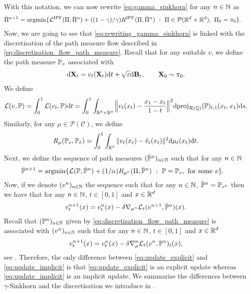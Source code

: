 \documentclass{article}
\begin{document}
 With this notation, we can now rewrite \eqref{eq:gamma_sinkhorn} for any $n \in \mathbb{N}$ as 
 \begin{align}
 \label{eq:rewriting_gamma_sinkhorn_2}
     &\bar{\Pi}^{n+1} = \argmin \ensembleLigne{\Lnonparam^{\mathrm{IPF}}(\Pi, \bar{\Pi}^n) + ((1-\gamma)/\gamma) R^{\mathrm{IPF}}(\Pi, \bar{\Pi}^n)}{\Pi \in \mathcal{P}(\rset^d \times \rset^d), \ \Pi_0 = \pi_0} . 
 \end{align}
  Now, we are going to see that \eqref{eq:rewriting_gamma_sinkhorn} is linked with the discretisation of the path measure flow described in \eqref{eq:discretisation_flow_path_measure}. Recall that for any suitable $v$, we define the path measure $\mathbb{P}_v$ associated with  
\begin{equation}
    \mathrm{d} \mathbf{X}_t = v_t(\mathbf{X}_t) \mathrm{d} t + \sqrt{\varepsilon} \mathrm{d} \mathbf{B}_t , \qquad \mathbf{X}_0 \sim \pi_0 . 
\end{equation}
 We define 
 \begin{equation}
\label{eq:loss_function_appendix}
    \Lnonparam(v, \Pbb) =\int_0^1  \Lnonparam(v_t, \Pbb)\rmd t= \int_0^1 \int_{\rset^d \times \rset^d} \Big\| v_t(x_t) - \frac{x_1 - x_t}{1-t}\Big\|^2 \rmd \projR{\Qbb}(\Pbb)_{t,1}(x_t, x_1) \rmd s . 
\end{equation}
Similarly, for any $\mu \in \mathcal{P}(\mathcal{C})$, we define 
\begin{equation}
    R_\mu(\mathbb{P}_v, \mathbb{P}_{\tilde{v}}) = \int_0^1 \int_{\mathbb{R}^d} \| v_t(x_t) - \tilde{v}_t(x_t)\|^2 \mathrm{d} \mu_t(x_t) \mathrm{d} t .  
\end{equation}
 Next, we define the sequence of path measures $(\bar{\mathbb{P}}^n)_{n \in \mathbb{N}}$ such that for any $n \in \mathbb{N}$
 \begin{align}
 \label{eq:rewriting_gamma_sinkhorn}
     &\bar{\Pbb}^{n+1} = \argmin \ensembleLigne{\Lnonparam(\Pbb, \bar{\Pbb}^n) + (1/\alpha) R_{\mu^n}(\Pi, \bar{\Pbb}^n)}{\Pbb = \Pbb_v, \ \text{for some $v$}} .
 \end{align}
 Now, if we denote $(v^n)_{n \in \mathbb{N}}$ the sequence such that for any $n \in \mathbb{N}$, $\bar{\mathbb{P}}^n = \mathbb{P}_{v^n}$ then we have that for any $n \in \mathbb{N}$, $t \in [0,1]$ and $x \in \mathbb{R}^d$
 \begin{equation}
 \label{eq:update_implicit}
     v^{n+1}_t(x) = v^n_t(x) - \delta \nabla_{\mu^n} \Lnonparam_t(v^{n+1}, \bar{\Pbb}^n)(x) .
 \end{equation}
 Recall that $(\mathbb{P}^n)_{n \in \mathbb{N}}$ given by \eqref{eq:discretisation_flow_path_measure} is associated with $(v^n)_{n \in \mathbb{N}}$ such that for any $n \in \mathbb{N}$, $t \in [0,1]$ and $x \in \mathbb{R}^d$
 \begin{equation}
  \label{eq:update_explicit}
     v^{n+1}_t(x) = v^n_t(x) - \delta \nabla_\mu^n \Lnonparam_t(v^{n}, \Pbb^n)_t(x) ,
 \end{equation}
 see . Therefore, the only difference between \eqref{eq:update_explicit} and \eqref{eq:update_implicit} is that \eqref{eq:update_explicit} is an explicit update whereas \eqref{eq:update_implicit} is an implicit update. We summarise the differences between $\gamma$-Sinkhorn and the discretisation we introduce in .
\end{document}
